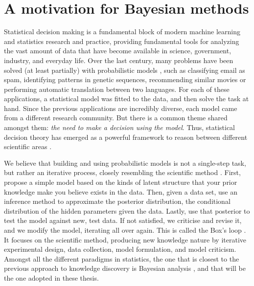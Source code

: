 
\section{A motivation for Bayesian methods}

Statistical decision making \cite{french2000statistical} is a fundamental block of modern machine learning and statistics research and practice,
providing fundamental tools for analyzing the vast amount of data that have become available in science, government, industry, and everyday life. Over the last century, many problems have been solved (at least partially) with probabilistic models \cite{bishop2006pattern}, such as classifying email as spam, identifying patterns in genetic sequences, recommending similar movies or performing automatic translation between two languages. For each of these applications, a statistical model was fitted to the data, and then solve the task at hand. Since the previous applications are incredibly diverse, each model came from a different research community. But there is a common theme shared amongst them: \emph{the need to make a decision using the model}. Thus, statistical decision theory has emerged as a powerful framework to reason between different scientific areas \cite{french2000statistical}.

We believe that building and using probabilistic models is not a single-step task, but rather an iterative process, closely resembling the scientific method \cite{conant1959understanding}. First, propose a simple model based on the kinds of latent structure that your prior knowledge make you believe exists in the data. Then, given a data set, use an inference
method to approximate the posterior distribution, the conditional distribution of the hidden parameters
given the data. Lastly,
use that posterior to test the model against new, test data. If not satisfied, we criticise and revise it, and we modify the model, iterating all over again. This is called the Box's loop \cite{doi:10.1080/00401706.1962.10490015,10.2307/1266125}. It focuses on the scientific method, producing new knowledge nature by iterative experimental design, data collection,
model formulation, and model criticism.
Amongst all the different paradigms in statistics, the one that is closest to the previous approach to knowledge discovery is Bayesian analysis \cite{gelman2013bayesian,insua2012bayesian}, and that will be the one adopted in these thesis.


